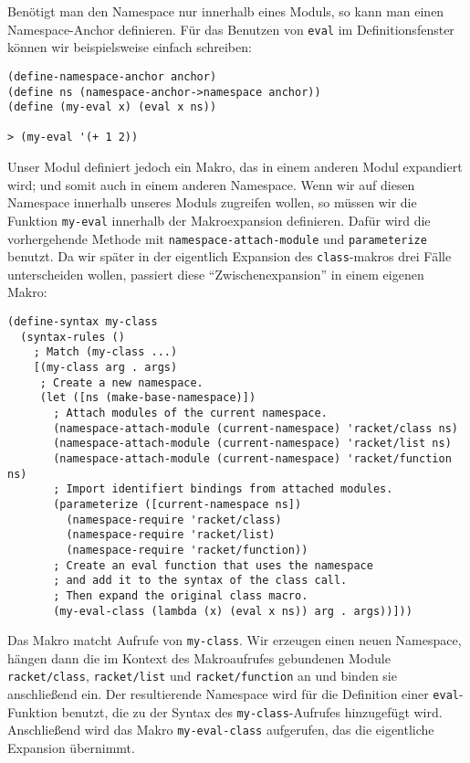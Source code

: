 Benötigt man den Namespace nur innerhalb eines Moduls, so kann man einen Name\-space-An\-chor definieren. Für das Benutzen von \texttt{eval} im Definitionsfenster können wir beispielsweise einfach schreiben:

\begin{lstlisting}
(define-namespace-anchor anchor)
(define ns (namespace-anchor->namespace anchor))
(define (my-eval x) (eval x ns))

> (my-eval '(+ 1 2))
\end{lstlisting}
{}

Unser Modul definiert jedoch ein Makro, das in einem anderen Modul expandiert wird; und somit auch in einem anderen Namespace. Wenn wir auf diesen Namespace innerhalb unseres Moduls zugreifen wollen, so müssen wir die Funktion \texttt{my-eval} innerhalb der Makroexpansion definieren. Dafür wird die vorhergehende Methode mit \texttt{namespace-attach-module} und \texttt{parameterize} benutzt. Da wir später in der eigentlich Expansion des \texttt{class}-makros drei Fälle unterscheiden wollen, passiert diese ``Zwischenexpansion'' in einem eigenen Makro:

\begin{lstlisting}
(define-syntax my-class
  (syntax-rules ()
    ; Match (my-class ...)
    [(my-class arg . args)
     ; Create a new namespace.
     (let ([ns (make-base-namespace)])
       ; Attach modules of the current namespace.
       (namespace-attach-module (current-namespace) 'racket/class ns)
       (namespace-attach-module (current-namespace) 'racket/list ns)
       (namespace-attach-module (current-namespace) 'racket/function ns)
       ; Import identifiert bindings from attached modules.
       (parameterize ([current-namespace ns])
         (namespace-require 'racket/class)
         (namespace-require 'racket/list)
         (namespace-require 'racket/function))
       ; Create an eval function that uses the namespace
       ; and add it to the syntax of the class call.
       ; Then expand the original class macro.
       (my-eval-class (lambda (x) (eval x ns)) arg . args))]))
\end{lstlisting}

Das Makro matcht Aufrufe von \texttt{my-class}. Wir erzeugen einen neuen Namespace, hängen dann die im Kontext des Makroaufrufes gebundenen Module \texttt{racket/class}, \texttt{racket/list} und \texttt{racket/function} an und binden sie anschließend ein. Der resultierende Namespace wird für die Definition einer \texttt{eval}-Funktion benutzt, die zu der Syntax des \texttt{my-class}-Aufrufes hinzugefügt wird. Anschließend wird das Makro \texttt{my-eval-class} aufgerufen, das die eigentliche Expansion übernimmt.

